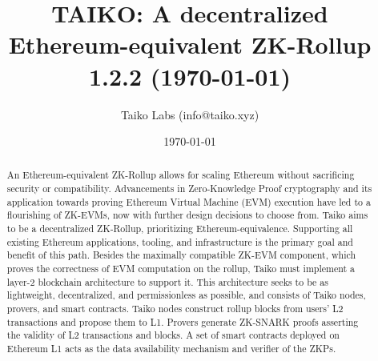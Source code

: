 \documentclass[9pt,oneside]{amsart}
\date{\today}
\title[TAIKO: A decentralized Ethereum-equivalent ZK-Rollup\\ \smaller
\textbf{{1.2.2}}]{TAIKO: A decentralized Ethereum-equivalent ZK-Rollup \\ \smaller \textbf{{1.2.2 (\today)}}}
\author{Taiko Labs (info@taiko.xyz)}
\begin{document}
\pagecolor{pagecolor}

\begin{abstract}
An Ethereum-equivalent ZK-Rollup allows for scaling Ethereum without sacrificing security or compatibility. Advancements in Zero-Knowledge Proof cryptography and its application towards proving Ethereum Virtual Machine (EVM) execution have led to a flourishing of ZK-EVMs, now with further design decisions to choose from. Taiko aims to be a decentralized ZK-Rollup, prioritizing Ethereum-equivalence. Supporting all existing Ethereum applications, tooling, and infrastructure is the primary goal and benefit of this path. Besides the maximally compatible ZK-EVM component, which proves the correctness of EVM computation on the rollup, Taiko must implement a layer-2 blockchain architecture to support it. This architecture seeks to be as lightweight, decentralized, and permissionless as possible, and consists of Taiko nodes, provers, and smart contracts. Taiko nodes construct rollup blocks from users' L2 transactions and propose them to L1. Provers generate ZK-SNARK proofs asserting the validity of L2 transactions and blocks. A set of smart contracts deployed on Ethereum L1 acts as the data availability mechanism and verifier of the ZKPs.

\end{abstract}

\maketitle
\end{document}
